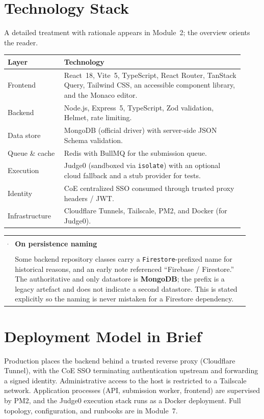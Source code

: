 \documentclass[12pt,a4paper,oneside]{report}
\makeatletter
\newcommand{\code}[1]{\texttt{#1}}
\newenvironment{callout}[1]{%
  \par\vspace{4pt}\noindent
  \begin{tabular}{@{}p{0.014\linewidth}@{\hspace{0.6em}}p{0.93\linewidth}@{}}
  \textcolor{boxframe}{\rule{2pt}{\baselineskip}} &
  \textbf{\textcolor{tcetblue}{#1}}\\[2pt]
  & }{\end{tabular}\par\vspace{6pt}}
\makeatother
\begin{document}
\section{Technology Stack}
A detailed treatment with rationale appears in Module~2; the overview orients the
reader.

\begin{longtable}{@{}p{0.22\linewidth} p{0.70\linewidth}@{}}
\toprule
\textbf{Layer} & \textbf{Technology}\\
\midrule
\endhead
Frontend & React~18, Vite~5, TypeScript, React Router, TanStack Query, Tailwind CSS, an accessible component library, and the Monaco editor.\\
Backend & Node.js, Express~5, TypeScript, Zod validation, Helmet, rate limiting.\\
Data store & MongoDB (official driver) with server-side JSON Schema validation.\\
Queue \& cache & Redis with BullMQ for the submission queue.\\
Execution & Judge0 (sandboxed via \code{isolate}) with an optional cloud fallback and a stub provider for tests.\\
Identity & CoE centralized SSO consumed through trusted proxy headers / JWT.\\
Infrastructure & Cloudflare Tunnels, Tailscale, PM2, and Docker (for Judge0).\\
\bottomrule
\end{longtable}

\begin{callout}{On persistence naming}
Some backend repository classes carry a \code{Firestore}-prefixed name for
historical reasons, and an early note referenced ``Firebase / Firestore.'' The
authoritative and only datastore is \textbf{MongoDB}; the prefix is a legacy
artefact and does not indicate a second datastore. This is stated explicitly so
the naming is never mistaken for a Firestore dependency.
\end{callout}

\section{Deployment Model in Brief}
Production places the backend behind a trusted reverse proxy (Cloudflare Tunnel),
with the CoE SSO terminating authentication upstream and forwarding a signed
identity. Administrative access to the host is restricted to a Tailscale network.
Application processes (API, submission worker, frontend) are supervised by PM2,
and the Judge0 execution stack runs as a Docker deployment. Full topology,
configuration, and runbooks are in Module~7.
\end{document}
